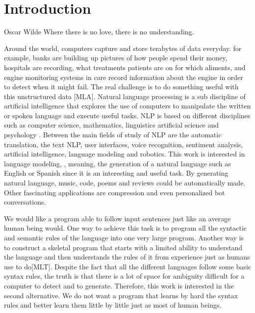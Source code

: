 \chapter{Introduction}
\label{ch:intro}

\begin{chapterquote}{Oscar Wilde}
	Where there is no love, there is no understanding.
\end{chapterquote}
Around the world, computers capture and store terabytes of data everyday. for example, banks are building up pictures of how people spend their money, hospitals are recording, what treatments patients are on for which aliments, and engine monitoring systems in care record information about the engine in order to detect when it might fail. The real challenge is to do something useful with this unstructured data [MLA].  Natural language processing is a sub discipline of artificial intelligence that explores the use of computers to manipulate the written or spoken language and execute useful tasks. NLP is based on different disciplines such as computer science, mathematics, linguistics artificial science and psychology \cite{chowdhury2003natural}.  Between the main fields of study of NLP are the automatic translation, the text NLP, user interfaces, voice recognition, sentiment analysis, artificial intelligence, language modeling and robotics. This work is interested in  language modeling, , meaning, the generation of a natural language such as English or Spanish since it is an interesting and useful task. By generating natural language, music, code, poems and reviews could be automatically made. Other fascinating applications are compression and even personalized bot conversations. 

We would like a program able to follow input sentences just like an average human being would. One way to achieve this task is to program all the syntactic and semantic rules of the language into one very large program. Another way is to construct a skeletal program that starts with a limited ability to understand the language and then understands the rules of it from experience just as humans use to do[MLT].  Despite the fact that all the different languages follow some basic syntax rules, the truth is that there is a lot of space for ambiguity difficult for a computer to detect and to generate.  Therefore, this work is interested in the second alternative. We do not want a program that learns by hard the syntax rules and better learn them little by little just as most of human beings. 

